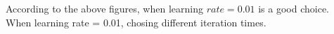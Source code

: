 \documentclass{article}
\begin{document}
\begin{itemize}
According to the above figures, when learning $rate = 0.01$ is a good choice.\\
\newpage
When learning rate = 0.01, chosing different iteration times.\\
\begin{figure}[htbp]
    \centering
    

\end{figure}
\end{itemize}
\end{document}
